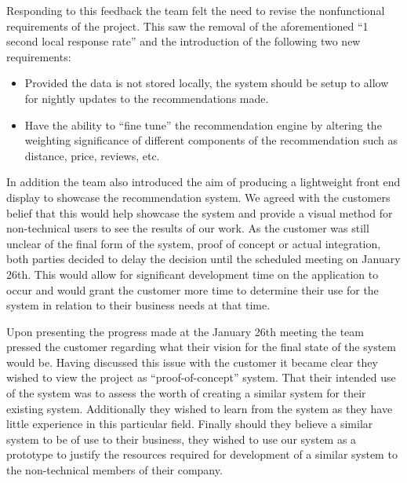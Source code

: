 \documentclass{l3proj}
\begin{document}
Responding to this feedback the team felt the need to revise the nonfunctional requirements of the project. This saw the removal of the aforementioned “1 second local response 
rate” and the introduction of the following two new requirements:

\begin{itemize}
\item Provided the data is not stored locally, the system should be setup to allow for nightly updates to the recommendations made.
\item Have the ability to “fine tune” the recommendation engine by altering the weighting significance of different components of the recommendation such as distance, price, 
reviews, etc.
\end{itemize}

In addition the team also introduced the aim of producing a lightweight front end display to showcase the recommendation system. We agreed with the customers belief that this would help showcase the system and provide a visual method for non-technical users to see the results of our work. As the customer was still unclear of the final form of the system, proof of concept or actual integration, both parties decided to delay the decision until the scheduled meeting on January 26th. This would allow for significant development time on the application to occur and would grant the customer more time to determine their use for the system in relation to their business needs at that time. 

Upon presenting the progress made at the January 26th meeting the team pressed the customer regarding what their vision for the final state of the system would be. Having discussed this issue with the customer it became clear they wished to view the project as “proof-of-concept” system. That their intended use of the system was to assess the worth of creating a similar system for their existing system. Additionally they wished to learn from the system as they have little experience in this particular field. Finally should they believe a similar system to be of use to their business, they wished to use our system as a prototype to justify the resources required for development of a similar system to the non-technical members of their company.
\end{document}

